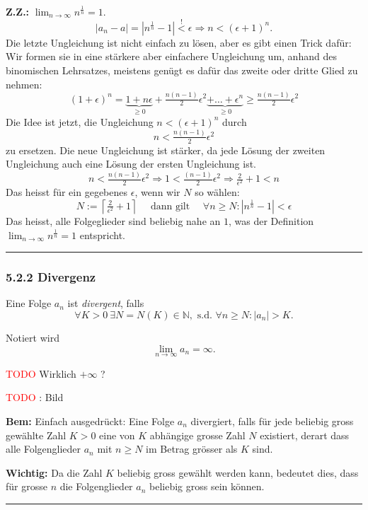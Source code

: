 \documentclass[a4paper,landscape,8pt]{extarticle}
\newcommand{\N}{\mathbb{N}}
\newcommand{\abs}[1]{\left\lvert #1 \right\rvert}
\newcommand{\ceil}[1]{\left\lceil #1 \right\rceil}
\newcommand{\todo}{\textcolor{red}{TODO }}
\newcommand{\sep}{\vspace{5pt}\noindent\hrule\vspace{5pt}}
\newcommand{\ZZ}{\textbf{Z.Z.: }}
\newcommand{\Bem}{\textbf{Bem: }}
\newcommand{\Wichtig}{\textbf{Wichtig: }}
\begin{document}
\begin{multicols*}{4}
\Bsp \ZZ $\lim_{n\to\infty} n^{\frac{1}{n}} = 1$.
\[
\abs{a_n - a}=\abs{n^{\frac{1}{n}}-1} \stackrel{!}{<} \epsilon
\Longrightarrow
n < (\epsilon + 1)^n.
\]
\Trick Die letzte Ungleichung ist nicht einfach zu lösen, aber es gibt einen
Trick dafür: Wir formen sie in eine stärkere aber einfachere Ungleichung um,
anhand des binomischen Lehrsatzes, meistens genügt es dafür das zweite oder
dritte Glied zu nehmen:
\[
(1+\epsilon)^n = \underbrace{1 + n\epsilon}_{\geq 0} + \tfrac{n(n-1)}{2}\epsilon
^2
\underbrace{+ \ldots + \epsilon ^n}_{\geq 0}
\geq 
\tfrac{n(n-1)}{2}\epsilon^2
\]
Die Idee ist jetzt, die Ungleichung $n<(\epsilon + 1)^n$ durch 
\[
n < \tfrac{n(n-1)}{2}\epsilon^2
\]
zu ersetzen. Die neue Ungleichung ist stärker, da jede Lösung der zweiten
Ungleichung  auch eine Lösung der ersten Ungleichung ist.
\[
n < \tfrac{n(n-1)}{2}\epsilon^2
\Longrightarrow 
1 < \tfrac{(n-1)}{2}\epsilon^2
\Longrightarrow 
\tfrac{2}{\epsilon^2}+1 < n
\]
Das heisst für ein gegebenes $\epsilon$, wenn wir $N$ so wählen:
\[
N:= \ceil{\tfrac{2}{\epsilon^2}+1}
\quad \text{ dann gilt } \quad 
\forall n \geq N : \abs{n^{\frac{1}{n}}-1} < \epsilon
\]
Das heisst, alle Folgeglieder sind beliebig nahe an $1$, was der Definition 
$\lim_{n\to\infty} n^{\frac{1}{n}} = 1$ entspricht.

\sep

\subsubsection{5.2.2 Divergenz}

\Def Eine Folge $a_n$ ist \emph{divergent}, falls
\[
\forall K > 0 \ \exists N=N(K)\in\N, \text{ s.d. } \forall n\geq N \colon
\abs{a_n} > K.
\]
\begin{warmup}
Notiert wird
\[
\lim_{n\to\infty} a_n = \infty.
\]

\todo{Wirklich $+\infty$ ?}

\todo: Bild
\end{warmup}

\Bem Einfach ausgedrückt: Eine Folge $a_n$ divergiert, falls für jede beliebig
gross gewählte Zahl $K>0$ eine von $K$ abhängige grosse Zahl $N$ existiert, derart
dass alle Folgenglieder $a_n$ mit $n \geq N$ im Betrag grösser als $K$ sind.

\Wichtig Da die Zahl $K$ beliebig gross gewählt werden kann, bedeutet dies, dass
für grosse $n$ die Folgenglieder $a_n$ beliebig gross sein können.

\sep



\end{multicols*}
\end{document}
